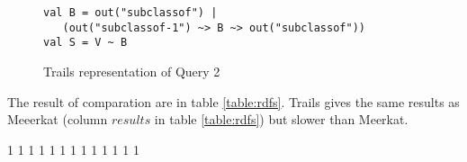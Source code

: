\begin{figure}[h]
\begin{lstlisting}
val B = out("subclassof") |
   (out("subclassof-1") ~> B ~> out("subclassof"))
val S = V ~ B
\end{lstlisting}
\caption{Trails representation of Query 2}
\label{fig:query2Trails}
\end{figure}

The result of comparation are in table \ref{table:rdfs}. Trails gives the same results as Meeerkat (column $results$ in table \ref{table:rdfs}) but slower than Meerkat.

1
1
1
1
1
1
1
1
1
1
1
1
1
